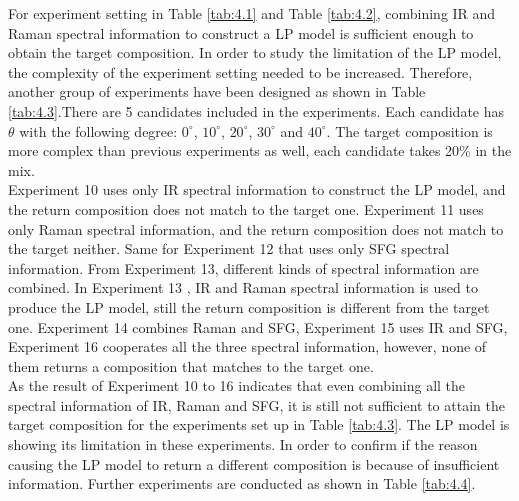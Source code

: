 
For experiment setting in Table \ref{tab:4.1} and Table \ref{tab:4.2}, combining IR and Raman spectral information to construct a LP model is sufficient enough to obtain the target composition. In order to study the limitation of the LP model, the complexity of the experiment setting needed to be increased. Therefore, another group of experiments have been designed as shown in Table \ref{tab:4.3}.There are 5 candidates included in the experiments. Each candidate has $\theta$ with the following degree: $0^{\circ}$, $10^{\circ}$, $20^{\circ}$, $30^{\circ}$ and $40^{\circ}$. The target composition is more complex than previous experiments as well, each candidate takes 20\% in the mix. \\

Experiment 10 uses only IR spectral information to construct the LP model, and the return composition does not match to the target one. Experiment 11 uses only Raman spectral information, and the return composition does not match to the target neither. Same for Experiment 12 that uses only SFG spectral information. From Experiment 13, different kinds of spectral information are combined. In Experiment 13 , IR and Raman spectral information is used to produce the LP model, still the return composition is different from the target one. Experiment 14 combines Raman and SFG, Experiment 15 uses IR and SFG, Experiment 16 cooperates all the three spectral information, however, none of them returns a composition that matches to the target one. \\

As the result of Experiment 10 to 16 indicates that even combining all the spectral information of IR, Raman and SFG, it is still not sufficient to attain the target composition for the experiments set up in Table \ref{tab:4.3}. The LP model is showing its limitation in these experiments. In order to confirm if the reason causing the LP model to return a different composition is because of insufficient information. Further experiments are conducted as shown in Table \ref{tab:4.4}. \\

